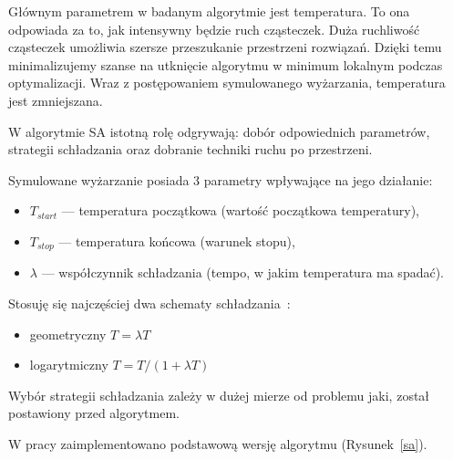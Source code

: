 Głównym parametrem w badanym algorytmie jest temperatura. To ona odpowiada za to, jak intensywny będzie ruch cząsteczek. Duża ruchliwość cząsteczek umożliwia szersze przeszukanie przestrzeni rozwiązań. Dzięki temu minimalizujemy szanse na utknięcie algorytmu w minimum lokalnym podczas optymalizacji. Wraz z postępowaniem symulowanego wyżarzania, temperatura jest zmniejszana.

W algorytmie SA istotną rolę odgrywają: dobór odpowiednich parametrów, strategii schładzania oraz dobranie techniki ruchu po przestrzeni.

\breakparagraph{}
Symulowane wyżarzanie posiada 3 parametry wpływające na jego działanie:
\begin{itemize}
	\item $T_{start}$ --- temperatura początkowa (wartość początkowa temperatury),
	\item $T_{stop}$ --- temperatura końcowa (warunek stopu),
	\item $\lambda$ --- współczynnik schładzania (tempo, w jakim temperatura ma spadać).
\end{itemize}

\breakparagraph{}
Stosuję się najczęściej dwa schematy schładzania~\cite{Smutnicki2002As}:
\begin{itemize}
	\item geometryczny $T = \lambda T$
	\item logarytmiczny $T = T /(1 + \lambda T)$
\end{itemize}

Wybór strategii schładzania zależy w dużej mierze od problemu jaki, został postawiony przed algorytmem.

\breakparagraph{}
W pracy zaimplementowano podstawową wersję algorytmu (Rysunek~\ref{sa}).
\raggedbottom{}


